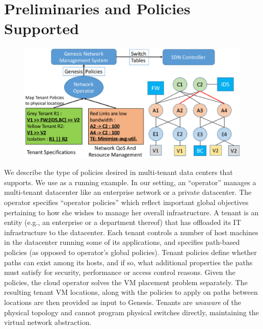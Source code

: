 \section{Preliminaries and Policies Supported}
\begin{figure}
	\includegraphics[width=\columnwidth,center]{figures/architecture.eps}
	\label{fig:architecture}
\end{figure}



We describe the type of policies desired in multi-tenant data centers
that \Name supports. We use  as a running
example. In our setting, an ``operator'' manages a multi-tenant
datacenter 
like an enterprise network or a private datacenter. 
The operator specifies ``operator policies''
which reflect important global objectives pertaining to how she wishes
to manage her overall infrastructure.
 A tenant is an entity (e.g., an enterprise or a department thereof)
 that has offloaded its IT infrastructure to the datacenter. Each
 tenant controls a number of host machines in the datacenter running
 some of its applications, and specifies path-based policies (as
 opposed to operator's global policies). Tenant policies define
 whether paths can exist among its hosts, and if so, what additional
 properties the paths must satisfy for security, performance or access
 control reasons. 
 Given the policies, the cloud operator 
 solves the VM placement problem separately. 
 The resulting tenant VM locations, along with the policies 
 to apply on paths between locations are then 
 provided as input to Genesis.  
 Tenants are \emph{unaware} of the physical topology and 
 cannot program physical switches directly, maintaining the virtual
 network abstraction.
 
